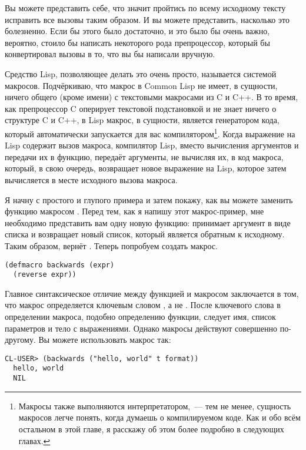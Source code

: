 Вы можете представить себе, что значит пройтись по всему исходному тексту исправить все
вызовы  таким образом. И вы можете представить, насколько это болезненно. Если
бы этого было достаточно, и это было бы очень важно, вероятно, стоило бы написать
некоторого рода препроцессор, который бы конвертировал вызовы  в то, что вы бы
написали вручную.

Средство Lisp, позволяющее делать это очень просто, называется системой
макросов. Подчёркиваю, что макрос в Common Lisp не имеет, в сущности, ничего общего (кроме
имени) с текстовыми макросами из C и C++. В то время, как препроцессор C оперирует
текстовой подстановкой и не знает ничего о структуре C и C++, в Lisp макрос, в сущности,
является генератором кода, который автоматически запускается для вас
компилятором\footnote{Макросы также выполняются интерпретатором,~--- тем не менее,
  сущность макросов легче понять, когда думаешь о компилируемом коде. Как и обо всём
  остальном в этой главе, я расскажу об этом более подробно в следующих главах.}. Когда
выражение на Lisp содержит вызов макроса, компилятор Lisp, вместо вычисления аргументов и
передачи их в функцию, передаёт аргументы, не вычисляя их, в код макроса, который, в свою
очередь, возвращает новое выражение на Lisp, которое затем вычисляется в месте исходного
вызова макроса.

Я начну с простого и глупого примера и затем покажу, как вы можете заменить функцию
 макросом . Перед тем, как я напишу этот макрос-пример, мне
необходимо представить вам одну новую функцию:  принимает аргумент в виде
списка и возвращает новый список, который является обратным к исходному. Таким образом,
 вернёт . Теперь попробуем создать макрос.

\begin{lstlisting}
(defmacro backwards (expr)
  (reverse expr))
\end{lstlisting}

Главное синтаксическое отличие между функцией и макросом заключается в том, что макрос
определяется ключевым словом , а не . После ключевого слова в
определении макроса, подобно определению функции, следует имя, список параметров и тело с
выражениями. Однако макросы действуют совершенно по-другому. Вы можете использовать макрос
так:

\begin{lstlisting}[style=lisprepl]
  CL-USER> (backwards ("hello, world" t format))
  hello, world
  NIL
\end{lstlisting}

